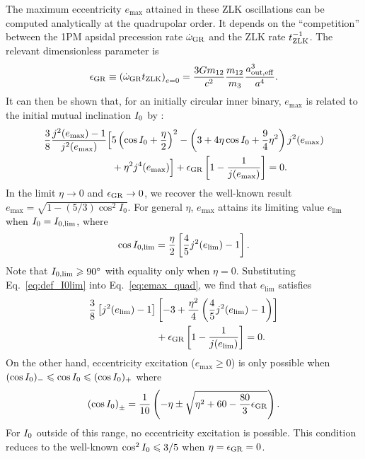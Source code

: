 \documentclass[
        fleqn,
        usenatbib,
    ]{mnras}
\newcommand*{\p}[1]{\left(#1\right)}
\newcommand*{\s}[1]{\left[#1\right]}
\begin{document}
The maximum eccentricity $e_{\max}$ attained in these ZLK oscillations can be
computed analytically at the quadrupolar order. It depends on the
``competition'' between the 1PM apsidal precession rate $\dot{\omega}_{\rm GR}$
and the ZLK rate $t_{\rm ZLK}^{-1}$. The relevant dimensionless parameter is
\begin{equation}
    \epsilon_{\rm GR} \equiv \p{\dot{\omega}_{\rm GR} t_{\rm ZLK}}_{e = 0}
        = \frac{3Gm_{12}}{c^2} \frac{m_{12}}{m_3}\frac{a_{\rm out, eff}^3}{a^4}.
\end{equation}
It can then be shown that, for an initially circular inner binary, $e_{\max}$ is
related to the initial mutual inclination $I_{\rm 0}$ by \citep{LML15,
anderson2016formation}:
\begin{align}
    \frac{3}{8}\frac{j^2(e_{\max}) - 1}{j^2(e_{\max})}\Big[&
        5\p{\cos I_0 + \frac{\eta}{2}}^2
        - \p{3 + 4\eta \cos I_0 + \frac{9}{4}\eta^2}j^2(e_{\max})
            \nonumber\\
        &+ \eta^2 j^4(e_{\max})
    \Big] + \epsilon_{\rm GR}\s{1 - \frac{1}{j(e_{\max})}} = 0.
    \label{eq:emax_quad}
\end{align}
In the limit $\eta \to 0$ and $\epsilon_{\rm GR} \to 0$, we recover the
well-known result $e_{\max} = \sqrt{1 - (5/3) \cos^2 I_0}$. For general $\eta$,
$e_{\max}$ attains its limiting value $e_{\lim}$ when $I_{\rm 0} = I_{\rm 0,
\lim}$, where
\begin{equation}
    \cos I_{\rm 0, \lim} = \frac{\eta}{2}\s{\frac{4}{5}j^2(e_{\lim}) -
        1}.\label{eq:def_I0lim}
\end{equation}
Note that $I_{\rm 0, \lim} \geq 90^\circ$ with equality only when $\eta
= 0$. Substituting Eq.~\eqref{eq:def_I0lim} into Eq.~\eqref{eq:emax_quad}, we find
that $e_{\lim}$ satisfies
\begin{align}
    \frac{3}{8}\s{j^2(e_{\lim}) - 1}&\s{-3 + \frac{\eta^2}{4}
        \p{\frac{4}{5}j^2(e_{\lim}) - 1}}\nonumber\\
        &+ \epsilon_{\rm GR}\s{1 - \frac{1}{j(e_{\lim})}} = 0.
        \label{eq:def_elim}
\end{align}
On the other hand, eccentricity excitation ($e_{\max} \geq 0$) is only possible
when $(\cos I_{\rm 0})_- \leq \cos I_{\rm 0} \leq (\cos I_{\rm 0})_+$ where
\begin{equation}
    \p{\cos I_{\rm 0}}_{\pm} = \frac{1}{10}\p{-\eta \pm \sqrt{\eta^2 + 60 -
        \frac{80}{3}\epsilon_{\rm GR}}}.\label{eq:I0bounds}
\end{equation}
For $I_{\rm 0}$ outside of this range, no eccentricity excitation is possible.
This condition reduces to the well-known $\cos^2 I_{\rm 0} \leq 3/5$ when $\eta
= \epsilon_{\rm GR} = 0$.
\end{document}
